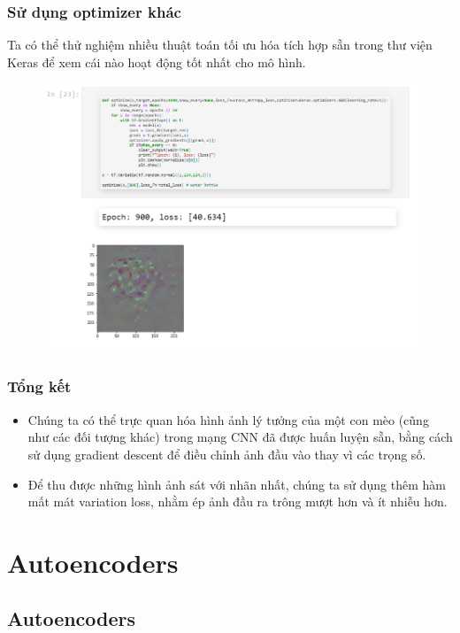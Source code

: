 \documentclass{book}
\begin{document}
\subsection{Sử dụng optimizer khác}
Ta có thể thử nghiệm nhiều thuật toán tối ưu hóa tích hợp sẵn trong thư viện Keras để xem cái nào hoạt động tốt nhất cho mô hình.
\begin{figure}[H]
	\centering
	\includegraphics[width=0.75\linewidth]{images/ad15_opti.png}
\end{figure}
\subsection{Tổng kết}
\begin{itemize}
	\item Chúng ta có thể trực quan hóa hình ảnh lý tưởng của một con mèo (cũng như các đối tượng khác) trong mạng CNN đã được huấn luyện sẵn, bằng cách sử dụng gradient descent để điều chỉnh ảnh đầu vào thay vì các trọng số.
	\item Để thu được những hình ảnh sát với nhãn nhất, chúng ta sử dụng thêm hàm mất mát variation loss, nhằm ép ảnh đầu ra trông mượt hơn và ít nhiễu hơn.
\end{itemize}

\chapter{Autoencoders}
\section{Autoencoders}
\end{document}
